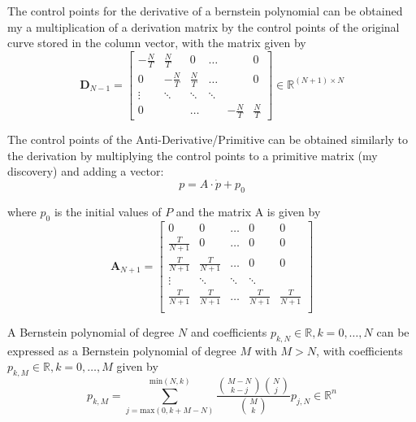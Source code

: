 \par The control points for the derivative of a bernstein polynomial can be obtained my a multiplication of a derivation matrix by the control points of the original curve stored in the column vector, with the matrix given by 
\begin{equation}
    \boldsymbol{D}_{N-1} = 
    \begin{bmatrix}
        -\frac{N}{T} & \frac{N}{T} & 0 & \ldots & & 0 \\
        0 & -\frac{N}{T} & \frac{N}{T} & \ldots & & 0 \\
        \vdots &  \ddots & \ddots & \ddots & &   \\
        0 & & \ldots & & -\frac{N}{T} & \frac{N}{T}
    \end{bmatrix} \in \mathbb{R}^{(N+1)\times N}
    \label{eq:bernderivmat}
\end{equation}

\par The control points of the Anti-Derivative/Primitive can be obtained similarly to the derivation by multiplying the control points to a primitive matrix (my discovery) and adding a vector:
\begin{equation}
    p = A \cdot \dot{p}  + p_0
\end{equation}

where $p_0$ is the initial values of $P$ and the matrix A is given by 
\begin{equation}
    \boldsymbol{A}_{N+1} = \begin{bmatrix}
        0 & 0 & \ldots & 0 & 0 \\
        \frac{T}{N+1} & 0 & \ldots & 0 & 0 \\
        \frac{T}{N+1} & \frac{T}{N+1} & \ldots & 0 & 0 \\
        \vdots & \ddots & \ddots & \ddots & \\
        \frac{T}{N+1} & \frac{T}{N+1} & \ldots & \frac{T}{N+1} & \frac{T}{N+1} \\
    \end{bmatrix}
\end{equation}

\par A Bernstein polynomial of degree $N$ and coefficients $p_{k,N}\in \mathbb{R}, k = 0,\dots,N$ can be expressed as a Bernstein polynomial of degree $M$ with $M>N$, with coefficients $p_{k,M} \in \mathbb{R}, k = 0,\dots,M$ given by 
\begin{equation}
    p_{k,M} = \sum_{j=\text{max}(0,k+M-N)}^{\text{min}(N,k)} \frac{{M-N \choose k-j}{N\choose j}}{{M\choose k}} p_{j,N} \in \mathbb{R}^n
\end{equation}


